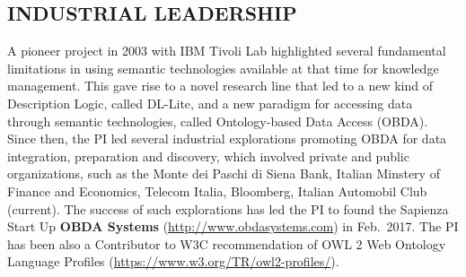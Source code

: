 \vspace{-1ex}
\subsection*{INDUSTRIAL LEADERSHIP}
\vspace{-1ex}

A pioneer project in 2003 with IBM Tivoli Lab highlighted several fundamental limitations in using semantic technologies available at that time for knowledge management. This gave rise to a novel research line that led to a new kind of Description Logic, called DL-Lite, and a new paradigm for accessing data through semantic technologies, called Ontology-based Data Access (OBDA). Since then, the PI led several industrial explorations promoting OBDA for data integration, preparation and discovery, which involved private and public organizations, such as the Monte dei Paschi di Siena Bank, Italian Minstery of Finance and Economics, Telecom Italia, Bloomberg, Italian Automobil Club (current). The success of such explorations has led the PI to found the Sapienza Start Up \textbf{OBDA Systems} (\url{http://www.obdasystems.com}) in Feb.\ 2017. The PI has been also a Contributor to W3C  recommendation of  OWL 2 Web Ontology Language 
Profiles (\url{https://www.w3.org/TR/owl2-profiles/}).



